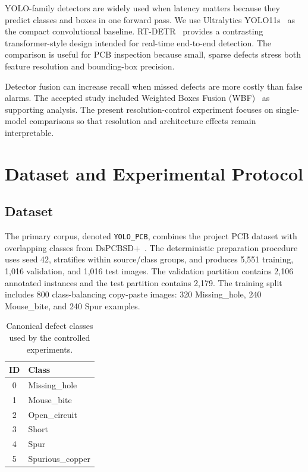 \documentclass[runningheads]{llncs}
\begin{document}
YOLO-family detectors are widely used when latency matters because they
predict classes and boxes in one forward pass. We use Ultralytics
YOLO11s~\cite{ultralytics2026yolo11} as the compact convolutional
baseline. RT-DETR~\cite{zhao2024rtdetr} provides a contrasting
transformer-style design intended for real-time end-to-end detection.
The comparison is useful for PCB inspection because small, sparse
defects stress both feature resolution and bounding-box precision.

Detector fusion can increase recall when missed defects are more costly
than false alarms. The accepted study included Weighted Boxes Fusion
(WBF)~\cite{solovyev2021wbf} as supporting analysis. The present
resolution-control experiment focuses on single-model comparisons so
that resolution and architecture effects remain interpretable.

\section{Dataset and Experimental Protocol}

\subsection{Dataset}

The primary corpus, denoted \texttt{YOLO\_PCB}, combines the project
PCB dataset with overlapping classes from DsPCBSD+~\cite{dspcbsdplus}.
The deterministic preparation procedure uses seed 42, stratifies within
source/class groups, and produces 5,551 training, 1,016 validation, and
1,016 test images. The validation partition contains 2,106 annotated
instances and the test partition contains 2,179. The training split
includes 800 class-balancing copy-paste images: 320 Missing\_hole,
240 Mouse\_bite, and 240 Spur examples.

\begin{table}
\caption{Canonical defect classes used by the controlled experiments.}
\label{tab:classes}
\centering
\begin{tabular}{cl}
\toprule
ID & Class\\
\midrule
0 & Missing\_hole\\
1 & Mouse\_bite\\
2 & Open\_circuit\\
3 & Short\\
4 & Spur\\
5 & Spurious\_copper\\
\bottomrule
\end{tabular}
\end{table}
\end{document}
